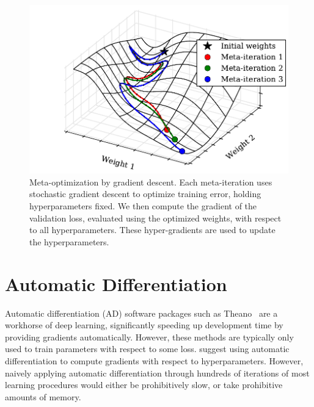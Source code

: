 \documentclass{article}
\begin{document}
\begin{figure}[ht]
\vskip 0.2in
\begin{center}
\includegraphics[width=\columnwidth]{../experiments/Jan_25_Figure_1/2/learning_curves.pdf}
\caption{Meta-optimization by gradient descent.
Each meta-iteration uses stochastic gradient descent to optimize training error, holding hyperparameters fixed.
We then compute the gradient of the validation loss, evaluated using the optimized weights, with respect to all hyperparameters.
These hyper-gradients are used to update the hyperparameters.}
\label{fig:chaos}
\end{center}
\vskip -0.2in
\end{figure} 


\section{Automatic Differentiation}

Automatic differentiation (AD) software packages such as Theano~\cite{Bastien-Theano-2012, bergstra2010scipy} are a workhorse of deep learning, significantly speeding up development time by providing gradients automatically.
However, these methods are typically only used to train parameters with respect to some loss.
\citet{Autodiff14} suggest using automatic differentiation to compute gradients with respect to hyperparameters.
However, naively applying automatic differentiation through hundreds of iterations of most learning procedures would either be prohibitively slow, or take prohibitive amounts of memory.
\end{document}
